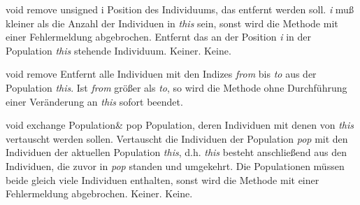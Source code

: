 \documentclass{report}
\begin{document}
\newpage

\setNormalInstance
\printMethodWithOneParam
{void}
{remove}
{unsigned}
{i}
{Position des Individuums, das entfernt werden soll.
                        {\em i} mu{\ss} kleiner als die Anzahl der Individuen in {\em this} sein, sonst wird die Methode mit einer
 Fehlermeldung abgebrochen.}
{Entfernt das an der Position {\em i} in der Population {\em this} stehende Individuum.}
{Keiner.}
{Keine.}

\vspace{4ex}

\setNormalInstance
\setCorrectWidthThree{8pt}
\printMethodWithParamsSaved
{void}
{}
{remove}
{Entfernt alle Individuen mit den Indizes {\em from} bis {\em to} aus der Population {\em this}.}
{Ist {\em from} gr\"o{\ss}er als {\em to}, so wird die Methode ohne Durchf\"uhrung
 einer Ver\"anderung an {\em this} sofort beendet.}
\setCorrectWidthThree{4pt}

\vspace{4ex}

\setNormalInstance
\printMethodWithOneParam
{void}
{exchange}
{Population\&}
{pop}
{Population, deren Individuen mit denen von {\em this}
                          vertauscht werden sollen.}
{Vertauscht die Individuen der Population {\em pop} mit den Individuen der
    aktuellen Population {\em this}, d.h. {\em this} besteht anschlie{\ss}end aus den 
    Individuen, die zuvor in {\em pop} standen und umgekehrt. Die Populationen
    m\"ussen beide gleich viele Individuen enthalten, sonst wird die
 Methode mit einer Fehlermeldung abgebrochen.}
{Keiner.}
{Keine.}
\end{document}
